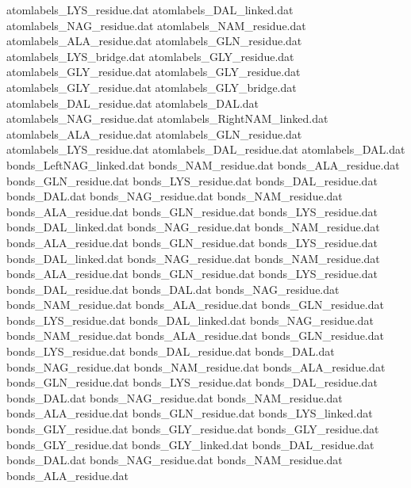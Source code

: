 atomlabels_LYS_residue.dat      
atomlabels_DAL_linked.dat       
atomlabels_NAG_residue.dat      
atomlabels_NAM_residue.dat      
atomlabels_ALA_residue.dat      
atomlabels_GLN_residue.dat      
atomlabels_LYS_bridge.dat       
atomlabels_GLY_residue.dat
atomlabels_GLY_residue.dat
atomlabels_GLY_residue.dat
atomlabels_GLY_residue.dat
atomlabels_GLY_bridge.dat
atomlabels_DAL_residue.dat      
atomlabels_DAL.dat              
atomlabels_NAG_residue.dat      
atomlabels_RightNAM_linked.dat  
atomlabels_ALA_residue.dat      
atomlabels_GLN_residue.dat      
atomlabels_LYS_residue.dat      
atomlabels_DAL_residue.dat      
atomlabels_DAL.dat              
bonds_LeftNAG_linked.dat        
bonds_NAM_residue.dat           
bonds_ALA_residue.dat           
bonds_GLN_residue.dat           
bonds_LYS_residue.dat           
bonds_DAL_residue.dat           
bonds_DAL.dat                   
bonds_NAG_residue.dat           
bonds_NAM_residue.dat           
bonds_ALA_residue.dat           
bonds_GLN_residue.dat           
bonds_LYS_residue.dat           
bonds_DAL_linked.dat            
bonds_NAG_residue.dat           
bonds_NAM_residue.dat           
bonds_ALA_residue.dat           
bonds_GLN_residue.dat           
bonds_LYS_residue.dat           
bonds_DAL_linked.dat            
bonds_NAG_residue.dat           
bonds_NAM_residue.dat           
bonds_ALA_residue.dat           
bonds_GLN_residue.dat           
bonds_LYS_residue.dat           
bonds_DAL_residue.dat           
bonds_DAL.dat                   
bonds_NAG_residue.dat           
bonds_NAM_residue.dat           
bonds_ALA_residue.dat           
bonds_GLN_residue.dat           
bonds_LYS_residue.dat           
bonds_DAL_linked.dat            
bonds_NAG_residue.dat           
bonds_NAM_residue.dat           
bonds_ALA_residue.dat           
bonds_GLN_residue.dat           
bonds_LYS_residue.dat           
bonds_DAL_residue.dat           
bonds_DAL.dat                   
bonds_NAG_residue.dat           
bonds_NAM_residue.dat           
bonds_ALA_residue.dat           
bonds_GLN_residue.dat           
bonds_LYS_residue.dat           
bonds_DAL_residue.dat           
bonds_DAL.dat                   
bonds_NAG_residue.dat           
bonds_NAM_residue.dat           
bonds_ALA_residue.dat           
bonds_GLN_residue.dat           
bonds_LYS_linked.dat            
bonds_GLY_residue.dat
bonds_GLY_residue.dat
bonds_GLY_residue.dat
bonds_GLY_residue.dat
bonds_GLY_linked.dat
bonds_DAL_residue.dat           
bonds_DAL.dat                   
bonds_NAG_residue.dat           
bonds_NAM_residue.dat           
bonds_ALA_residue.dat           
